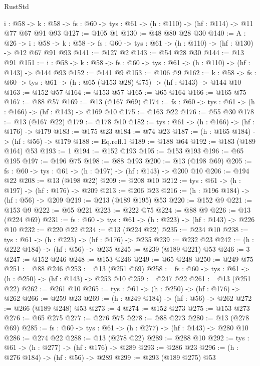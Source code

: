 \begin{lexlean}{RustStd}
\begin{coremodule}
{\begin{coremodule}
{{{{{{{{{{{{{{{{{{{{{  {i : @58} ->
  {k : @58} -> {fs : @60} -> {tys : @61} -> (h : @110) -> (hf : @114) -> @11 @77 @67 @91 @93
@127 := @105 @1
@130 := @48 @80 @28 @30
@140 := {A : @26} ->
  {i : @58} ->
  {k : @58} -> {fs : @60} -> {tys : @61} -> (h : @110) -> (hf : @130) -> @12 @67 @91 @93
@141 := @127 @2
@143 := @54 @28 @30
@144 := @13 @91
@151 := {i : @58} -> {k : @58} -> {fs : @60} -> {tys : @61} -> (h : @110) -> (hf : @143) -> @144 @93
@152 := @141 @9
@153 := @106 @9
@162 := {k : @58} ->
  {fs : @60} -> {tys : @61} -> (h : @65 (@153 @28) @75) -> (hf : @143) -> @144 @10
@163 := @152 @57
@164 := @153 @57
@165 := @65 @164
@166 := @165 @75
@167 := @88 @57
@169 := @13 (@167 @69)
@174 := {fs : @60} -> {tys : @61} -> (h : @166) -> (hf : @143) -> @169 @10
@175 := @163 @22
@176 := @55 @30
@178 := @13 (@167 @22)
@179 := @178 @10
@182 := {tys : @61} -> (h : @166) -> (hf : @176) -> @179
@183 := @175 @23
@184 := @74 @23
@187 := (h : @165 @184) -> (hf : @56) -> @179
@188 := Eq.refl.{1}
@189 := @188 @64
@192 := @183 (@189 @164) @53
@193 := 1
@194 := @152 @193
@195 := @153 @193
@196 := @65 @195
@197 := @196 @75
@198 := @88 @193
@200 := @13 (@198 @69)
@205 := {fs : @60} -> {tys : @61} -> (h : @197) -> (hf : @143) -> @200 @10
@206 := @194 @22
@208 := @13 (@198 @22)
@209 := @208 @10
@212 := {tys : @61} -> (h : @197) -> (hf : @176) -> @209
@213 := @206 @23
@216 := (h : @196 @184) -> (hf : @56) -> @209
@219 := @213 (@189 @195) @53
@220 := @152 @9
@221 := @153 @9
@222 := @65 @221
@223 := @222 @75
@224 := @88 @9
@226 := @13 (@224 @69)
@231 := {fs : @60} -> {tys : @61} -> (h : @223) -> (hf : @143) -> @226 @10
@232 := @220 @22
@234 := @13 (@224 @22)
@235 := @234 @10
@238 := {tys : @61} -> (h : @223) -> (hf : @176) -> @235
@239 := @232 @23
@242 := (h : @222 @184) -> (hf : @56) -> @235
@245 := @239 (@189 @221) @53
@246 := 3
@247 := @152 @246
@248 := @153 @246
@249 := @65 @248
@250 := @249 @75
@251 := @88 @246
@253 := @13 (@251 @69)
@258 := {fs : @60} -> {tys : @61} -> (h : @250) -> (hf : @143) -> @253 @10
@259 := @247 @22
@261 := @13 (@251 @22)
@262 := @261 @10
@265 := {tys : @61} -> (h : @250) -> (hf : @176) -> @262
@266 := @259 @23
@269 := (h : @249 @184) -> (hf : @56) -> @262
@272 := @266 (@189 @248) @53
@273 := 4
@274 := @152 @273
@275 := @153 @273
@276 := @65 @275
@277 := @276 @75
@278 := @88 @273
@280 := @13 (@278 @69)
@285 := {fs : @60} -> {tys : @61} -> (h : @277) -> (hf : @143) -> @280 @10
@286 := @274 @22
@288 := @13 (@278 @22)
@289 := @288 @10
@292 := {tys : @61} -> (h : @277) -> (hf : @176) -> @289
@293 := @286 @23
@296 := (h : @276 @184) -> (hf : @56) -> @289
@299 := @293 (@189 @275) @53
}}}}}}}}}}}}}}}}}}}}}
\end{coremodule}}
\end{coremodule}
\end{lexlean}
